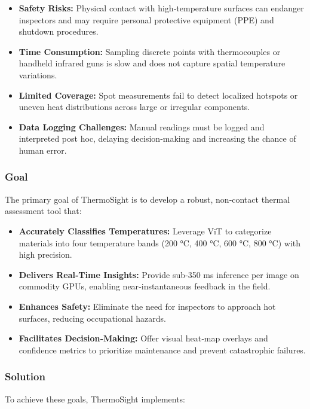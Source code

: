 \begin{itemize}
    \item \textbf{Safety Risks:} Physical contact with high‐temperature surfaces can endanger inspectors and may require personal protective equipment (PPE) and shutdown procedures.
    \item \textbf{Time Consumption:} Sampling discrete points with thermocouples or handheld infrared guns is slow and does not capture spatial temperature variations.
    \item \textbf{Limited Coverage:} Spot measurements fail to detect localized hotspots or uneven heat distributions across large or irregular components.
    \item \textbf{Data Logging Challenges:} Manual readings must be logged and interpreted post hoc, delaying decision‐making and increasing the chance of human error.
\end{itemize}

\subsubsection*{Goal}
The primary goal of ThermoSight is to develop a robust, non‐contact thermal assessment tool that:

\begin{itemize}
    \item \textbf{Accurately Classifies Temperatures:} Leverage ViT to categorize materials into four temperature bands (200 °C, 400 °C, 600 °C, 800 °C) with high precision.
    \item \textbf{Delivers Real‐Time Insights:} Provide sub‐350 ms inference per image on commodity GPUs, enabling near‐instantaneous feedback in the field.
    \item \textbf{Enhances Safety:} Eliminate the need for inspectors to approach hot surfaces, reducing occupational hazards.
    \item \textbf{Facilitates Decision‐Making:} Offer visual heat‐map overlays and confidence metrics to prioritize maintenance and prevent catastrophic failures.
\end{itemize}

\subsubsection*{Solution}
To achieve these goals, ThermoSight implements:

